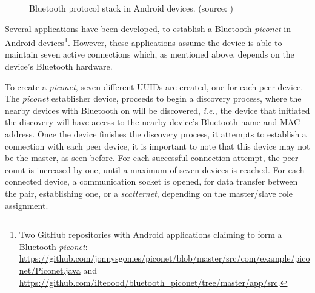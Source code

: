 \begin{figure}[ht]
	\noindent{}
	\caption{\label{fig:btstack} Bluetooth protocol stack in Android devices. (source: \cite{androidbtintro})}
\end{figure}

Several applications have been developed, to establish a Bluetooth \textit{piconet} in Android devices\footnote{Two GitHub repositories with Android applications claiming to form a Bluetooth \textit{piconet}: \url{https://github.com/jonnysgomes/piconet/blob/master/src/com/example/piconet/Piconet.java} and \url{https://github.com/ilteoood/bluetooth_piconet/tree/master/app/src}.}. However, these applications assume the device is able to maintain seven active connections which, as mentioned above, depends on the device's Bluetooth hardware.

To create a \textit{piconet}, seven different \glspl{UUID} are created, one for each peer device. The \textit{piconet} establisher device, proceeds to begin a discovery process, where the nearby devices with Bluetooth on will be discovered, \textit{i.e.}, the device that initiated the discovery will have access to the nearby device's Bluetooth name and \gls{MAC} address. Once the device finishes the discovery process, it attempts to establish a connection with each peer device, it is important to note that this device may not be the master, as seen before. For each successful connection attempt, the peer count is increased by one, until a maximum of seven devices is reached. For each connected device, a communication socket is opened, for data transfer between the pair, establishing one, or a \textit{scatternet}, depending on the master/slave role assignment.

